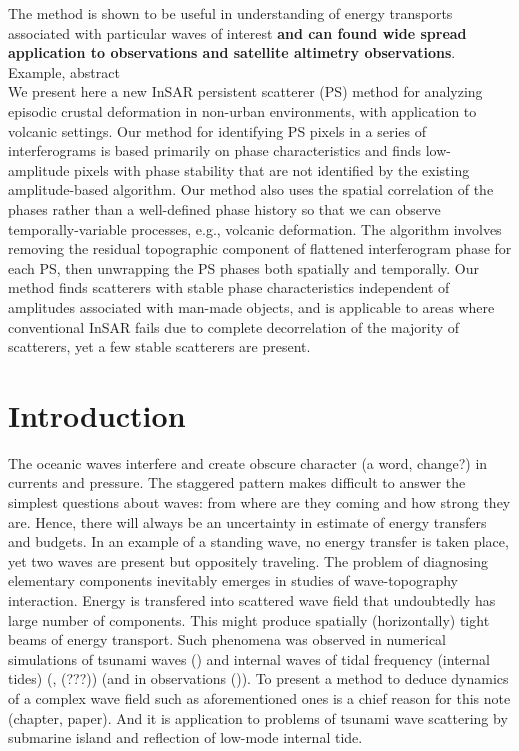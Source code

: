  The method is shown to be useful in understanding of energy transports associated with particular waves of interest\textbf{ and can found wide spread application to observations and satellite altimetry observations}.\\
Example, abstract\\
We present here a new InSAR persistent scatterer (PS) method for analyzing episodic crustal deformation in non-urban environments, with application to volcanic settings. Our method for identifying PS pixels in a series of interferograms is based primarily on phase characteristics and finds low-amplitude pixels with phase stability that are not identified by the existing amplitude-based algorithm. Our method also uses the spatial correlation of the phases rather than a well-defined phase history so that we can observe temporally-variable processes, e.g., volcanic deformation. The algorithm involves removing the residual topographic component of flattened interferogram phase for each PS, then unwrapping the PS phases both spatially and temporally. Our method finds scatterers with stable phase characteristics independent of amplitudes associated with man-made objects, and is applicable to areas where conventional InSAR fails due to complete decorrelation of the majority of scatterers, yet a few stable scatterers are present.\\


\section{Introduction}
The oceanic waves interfere and create obscure character (a word, change?) in currents and pressure. The staggered pattern makes difficult to answer the simplest questions about waves: from where are they coming and how strong they are. Hence, there will always be an uncertainty in estimate of energy transfers and budgets. In an example of a standing wave, no energy transfer is taken place, yet two waves are present but oppositely traveling. The problem of diagnosing elementary components inevitably emerges in studies of wave-topography interaction. Energy is transfered into scattered wave field that undoubtedly has large number of components. This might produce spatially (horizontally) tight beams of energy transport. Such phenomena was observed in numerical simulations of tsunami waves (\cite{tang2012direct}) and internal waves of tidal frequency (internal tides) (\cite{simmons2004internal}, \cite{arbic2010concurrent}(???)) (and in observations (\cite{zhao2016global})). To present a method to deduce dynamics of a complex wave field such as aforementioned ones is a chief reason for this note (chapter, paper). And it is application to problems of tsunami wave scattering by submarine island and reflection of low-mode internal tide.\\

